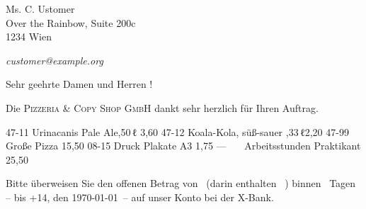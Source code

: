 \documentclass[fontsize=11pt,parskip=full]{scrlttr2}
\begin{document}
	\def\payperiod		{14}	%
					\def\invoicenumber	{42}	%
	\begin{letter}{%
%
					Ms. C. Ustomer\\
					Over the Rainbow, Suite 200c\\
					1234 Wien\\				
					\vspace{.25em}\par		%
					 \hfill\emph{customer@example.org}
	}
		\opening{Sehr geehrte Damen und Herren\kern 1pt !}

		Die \textsc{Pizzeria \& Copy Shop GmbH} dankt sehr herzlich 
		für Ihren Auftrag.

		\begin{invoice*}[B]				%
			\NumbersOff					%
			\SeparatorOff
	{47-11}		{Urinacanis Pale Ale,50\,ℓ}	{3,60}
	{47-12}		{Koala-Kola, süß-sauer ,33\,ℓ}{2,20}
	{47-99}		{Große Pizza}						{15,50}
	{08-15}		{Druck Plakate \tab A3}				{1,75}
	{---~~~}	{Arbeitsstunden Praktikant}			{25,50}

		\end{invoice*}



		Bitte überweisen Sie den offenen Betrag von 
		\Total\ (darin enthalten \TaxAmnt ~\TaxAbrv) 
		binnen \numberstringnum{\payperiod}~Tagen – bis \DayName{\year}{\month}%
		{\day+\payperiod}, den \AdvanceDate[\payperiod]\today\ – 
		auf unser Konto bei der X-Bank.


\end{letter}
\end{document}
